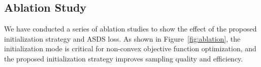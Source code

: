 \documentclass{article}
\begin{document}
\subsection{Ablation Study}
We have conducted a series of ablation studies to show the effect of the proposed initialization strategy and ASDS loss.
As shown in Figure~\ref{fig:ablation}, the initialization mode is critical for non-convex objective function optimization, and the proposed initialization strategy improves sampling quality and efficiency. 
\end{document}
